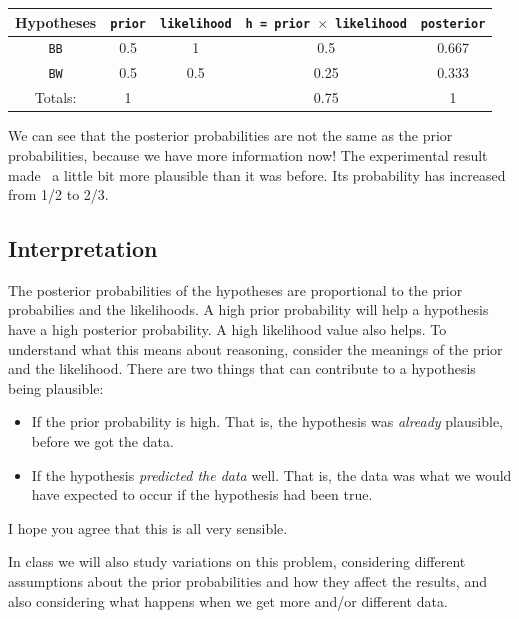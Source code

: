 \begin{table}[!ht]
\begin{center}
\begin{tabular}{|c|c|c|c|c|}
\hline
{\bf Hypotheses} & {\tt prior} & {\tt likelihood} &
{\tt h = prior $\times$ likelihood} & {\tt posterior}\\
\hline
{\tt BB} & 0.5 & 1 & 0.5 & 0.667\\
{\tt BW} & 0.5 & 0.5 & 0.25  & 0.333\\
\hline
Totals: & 1 & & 0.75 & 1\\
\hline
\end{tabular}
\end{center}
\end{table}
We can see that the posterior probabilities are not the same as the prior
probabilities, because we have more information now! The experimental result
made \bb~a little bit more plausible than it was before. Its probability has
increased from 1/2 to 2/3.

\subsection{Interpretation}
The posterior probabilities of the hypotheses are proportional to the prior probabilies
and the likelihoods. A high prior probability will help a hypothesis have a high
posterior probability. A high likelihood value also helps.
To understand what this means about reasoning, consider
the meanings of the prior and the likelihood. There are two things that can
contribute to a hypothesis being plausible:
\begin{itemize}
\item If the prior probability is high. That is, the hypothesis was {\it already}
plausible, before we got the data.
\item If the hypothesis {\it predicted the data} well. That is, the data was
what we would have expected to occur if the hypothesis had been true.
\end{itemize}
I hope you agree that this is all very sensible.

In class we will also study
variations on this problem, considering different assumptions about the prior
probabilities and how they affect the results, and also considering what happens
when we get more and/or different data.

